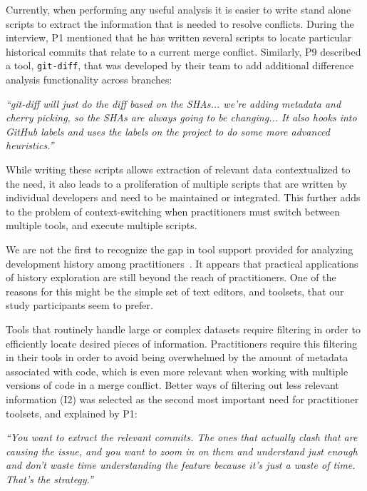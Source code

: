 Currently, when performing any useful analysis it is easier to write stand alone scripts to extract the information that is needed to resolve conflicts. 
During the interview, P1 mentioned that he has written several scripts to locate particular historical commits that relate to a current merge conflict. 
Similarly, P9 described a tool, \texttt{git-diff}, that was developed by their team to add additional difference analysis functionality across branches:
\begin{displayquote}
\textit{``git-diff will just do the diff based on the SHAs... we're adding metadata and cherry picking, so the SHAs are always going to be changing... It also hooks into GitHub labels and uses the labels on the project to do some more advanced heuristics.''}
\end{displayquote}

While writing these scripts allows extraction of relevant data contextualized to the need, it also leads to a proliferation of multiple scripts that are written by individual developers and need to be maintained or integrated.
This further adds to the problem of context-switching when practitioners must switch between multiple tools, and execute multiple scripts.

We are not the first to recognize the gap in tool support provided for analyzing development history among practitioners~\cite{sun2015informationhistory, guo2016cold-start, yan2014miningcontracts}. 
It appears that practical applications of history exploration are still beyond the reach of practitioners. 
One of the reasons for this might be the simple set of text editors, and toolsets, that our study participants seem to prefer.

Tools that routinely handle large or complex datasets require filtering in order to efficiently locate desired pieces of information.
Practitioners require this filtering in their tools in order to avoid being overwhelmed by the amount of metadata associated with code, which is even more relevant when working with multiple versions of code in a merge conflict.
Better ways of filtering out less relevant information (I2) was selected as the second most important need for practitioner toolsets, and explained by P1:
\begin{displayquote}
\textit{``You want to extract the relevant commits. The ones that actually clash that are causing the issue, and you want to zoom in on them and understand just enough and don't waste time understanding the feature because it's just a waste of time. That's the strategy.''}
\end{displayquote}

